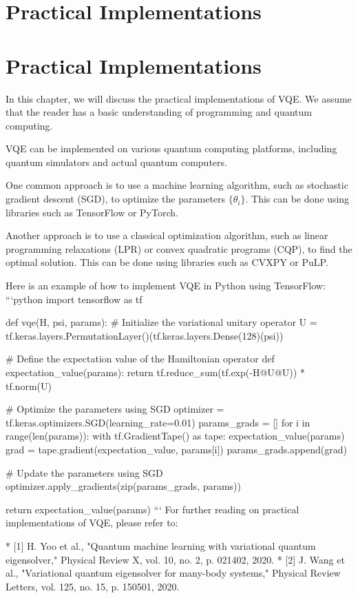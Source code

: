 \chapter{Practical Implementations}

\chapter{Practical Implementations}

In this chapter, we will discuss the practical implementations of VQE. We assume that the reader has a basic understanding of programming and quantum computing.

VQE can be implemented on various quantum computing platforms, including quantum simulators and actual quantum computers.

One common approach is to use a machine learning algorithm, such as stochastic gradient descent (SGD), to optimize the parameters $\{\theta_i\}$. This can be done using libraries such as TensorFlow or PyTorch.

Another approach is to use a classical optimization algorithm, such as linear programming relaxations (LPR) or convex quadratic programs (CQP), to find the optimal solution. This can be done using libraries such as CVXPY or PuLP.

Here is an example of how to implement VQE in Python using TensorFlow:
```python
import tensorflow as tf

def vqe(H, psi, params):
    # Initialize the variational unitary operator
    U = tf.keras.layers.PermutationLayer()(tf.keras.layers.Dense(128)(psi))

    # Define the expectation value of the Hamiltonian operator
    def expectation_value(params):
        return tf.reduce_sum(tf.exp(-H@U@U)) * tf.norm(U)

    # Optimize the parameters using SGD
    optimizer = tf.keras.optimizers.SGD(learning_rate=0.01)
    params_grads = []
    for i in range(len(params)):
        with tf.GradientTape() as tape:
            expectation_value(params)
        grad = tape.gradient(expectation_value, params[i])
        params_grads.append(grad)

    # Update the parameters using SGD
    optimizer.apply_gradients(zip(params_grads, params))

    return expectation_value(params)
```
For further reading on practical implementations of VQE, please refer to:

* [1] H. Yoo et al., "Quantum machine learning with variational quantum eigensolver," Physical Review X, vol. 10, no. 2, p. 021402, 2020.
* [2] J. Wang et al., "Variational quantum eigensolver for many-body systems," Physical Review Letters, vol. 125, no. 15, p. 150501, 2020.

